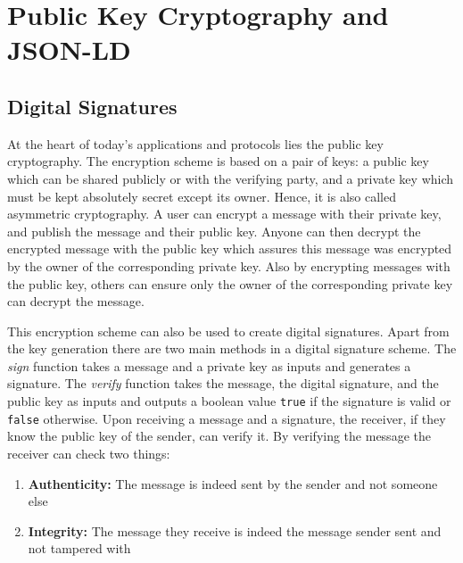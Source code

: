 



\section{Public Key Cryptography and JSON-LD}

\subsection{Digital Signatures}

At the heart of today's applications and protocols lies the public key cryptography. The encryption scheme is based on a pair of keys: a public key which can be shared publicly or with the verifying party, and a private key which must be kept absolutely secret except its owner. Hence, it is also called asymmetric cryptography. A user can encrypt a message with their private key, and publish the message and their public key. Anyone can then decrypt the encrypted message with the public key which assures this message was encrypted by the owner of the corresponding private key. Also by encrypting messages with the public key, others can ensure only the owner of the corresponding private key can decrypt the message.

This encryption scheme can also be used to create digital signatures. Apart from the key generation there are two main methods in a digital signature scheme. The \textit{sign} function takes a message and a private key as inputs and generates a signature. The \textit{verify} function takes the message, the digital signature, and the public key as inputs and outputs a boolean value \lstinline{true} if the signature is valid or \lstinline{false} otherwise. Upon receiving a message and a signature, the receiver, if they know the public key of the sender, can verify it. By verifying the message the receiver can check two things:
\begin{enumerate}
    \item \textbf{Authenticity:} The message is indeed sent by the sender and not someone else
    \item \textbf{Integrity:} The message they receive is indeed the message sender sent and not tampered with
\end{enumerate}

